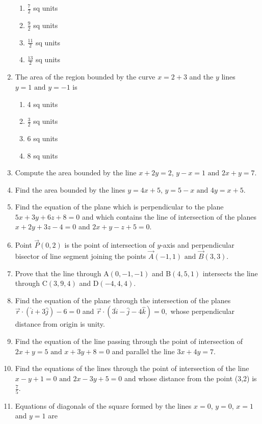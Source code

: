 \begin{enumerate}[label=\thesubsection.\arabic*,ref=\thesubsection.\theenumi]
\begin{enumerate}
\item $\frac{7}{2}$ sq units
\item $\frac{9}{2}$ sq units
\item $\frac{11}{2}$ sq units
\item $\frac{13}{2}$ sq units
\end{enumerate}   
\item The area of the region bounded by the curve $x = 2 + 3$ and the $y$ lines $y = 1\text{ and }y = - 1$ is
\begin{enumerate}
\item 4 sq units 
\item $\frac{3}{2}$ sq units
\item 6 sq units
\item 8 sq units
\end{enumerate}
\item Compute the area bounded by the line $x + 2y = 2$, $y - x = 1\text{ and }2x + y = 7$.
\item Find the area bounded by the lines $y = 4x + 5$, $y = 5 - x\text{ and }4y = x + 5$.
\item Find the equation of the plane which is perpendicular to the plane $5x+3y+6z+8=0$ and which contains the line of intersection of the planes $x+2y+3z-4=0$ and $2x+y-z+5=0.$
\item  Point $\vec{P}(0,2)$ is the point of intersection of $y$-axis and perpendicular bisector of line segment joining the points $\vec{A}(-1,1) \text{ and } \vec{B}(3,3)$.
\item Prove that the line through A$(0,-1,-1)$ and B$(4,5,1)$ intersects the line through C$(3,9,4)$ and D$(-4,4,4)$.
\item Find the equation of the plane through the intersection of the planes $\overrightarrow{r} \cdot (\hat{i}+3\hat{j}) - 6=0$ and $\overrightarrow{r} \cdot (3\hat{i}-\hat{j}-4\hat{k})=0,$ whose perpendicular distance from origin is unity.
\item Find the equation of the line passing through the point of intersection of $2x+y=5\text{ and }x+3y+8=0$ and parallel the line $3x+4y=7$.
\item Find the equations of the lines through the point of intersection of the line $x-y+1=0 \text{ and }2x-3y+5=0$ and whose distance from the point (3,2) is $\frac{7}{5}$.
\item Equations of diagonals of the square formed by the lines $x=0$, $y=0$, $x=1$ and $y=1$ are
\begin{enumerate}

\end{enumerate}
\end{enumerate}

